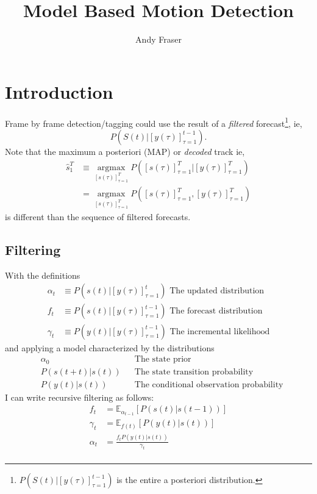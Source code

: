 \documentclass[12pt]{article}
\title{Model Based Motion Detection}
\author{Andy Fraser}
\newcommand{\field}[1]{\mathbb{#1}}
\newcommand{\EV}[2]{\field{E}_{#1}\left[#2\right]}
\newcommand{\os}[4]{{\left[ #1(#2) \right]}_{#3}^{#4}} %
\newcommand{\ti}[2]{{#1}{(#2)}}                         %
\newcommand{\ts}[4]{\os{#1}{#2}{#2=#3}{#4}} %
\newcommand{\argmax}{\operatorname*{argmax}}
\begin{document}
\maketitle

\section{Introduction}
\label{sec:introduction}

Frame by frame detection/tagging could use the result of a
\emph{filtered} forecast\footnote{$P(S(t)|\ts{y}{\tau}{1}{t-1})$ is
  the entire a posteriori distribution.}, ie,
\begin{equation*}
  P(S(t)|\ts{y}{\tau}{1}{t-1}).
\end{equation*}
Note that the maximum a posteriori (MAP) or \emph{decoded} track ie,
\begin{align*}
  \hat s_1^T &\equiv \argmax_{\ts{s}{\tau}{1}{T}}
  P(\ts{s}{\tau}{1}{T}|\ts{y}{\tau}{1}{T}) \\
  &= \argmax_{\ts{s}{\tau}{1}{T}} P(\ts{s}{\tau}{1}{T},\ts{y}{\tau}{1}{T})
\end{align*}
is different than the sequence of filtered forecasts.

\subsection{Filtering}
\label{sec:filtering}

With the definitions
\begin{align}
  \label{def:alpha}
  \alpha_t &\equiv P(\ti{s}{t}|\ts{y}{\tau}{1}{t}) \text{ The updated distribution} \\
  f_t &\equiv P(\ti{s}{t}|\ts{y}{\tau}{1}{t-1}) \text{ The forecast
    distribution} \\
  \gamma_t &\equiv P(\ti{y}{t}|\ts{y}{\tau}{1}{t-1}) \text{ The
    incremental likelihood}
\end{align}
and applying a model characterized by the distributions
\begin{align}
  \label{def:alpha0}
  &\alpha_0  &&\text{The state prior} \\
  &P(\ti{s}{t+t}|\ti{s}{t}) &&\text{The state transition probability} \\
  &P(\ti{y}{t}|\ti{s}{t}) &&\text{The conditional observation probability}
\end{align}
I can write recursive filtering as follows:
\begin{align}
  f_t &= \EV{\alpha_{t-1}} {P(\ti{s}{t}|\ti{s}{t-1})} \\
  \gamma_t &= \EV{\ti{f}{t}} {P(\ti{y}{t}|\ti{s}{t})} \\
  \alpha_t &= \frac{f_t P(\ti{y}{t}|\ti{s}{t})}{\gamma_t} \\
\end{align}
\end{document}
